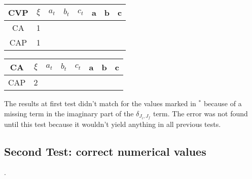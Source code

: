 \documentclass[twocolumn]{article}
\begin{document}
\begin{table}[H]
	\begin{tabular}{|c|c|c|c|c|c|c|c|}
		\hline
		CVP & $\xi $& $a_t$ & $b_t$ & $c_t$ & a & b & c \\
		\hline
		CA & 1 &   &   &   &   &   &   \\
		\hline
		CAP & 1 &   &   &   &   &   &   \\
		\hline
	\end{tabular}
\end{table}

\begin{table}[H]
	\begin{tabular}{|c|c|c|c|c|c|c|c|}
		\hline
		CA & $\xi $& $a_t$ & $b_t$ & $c_t$ & a & b & c \\
		\hline
		CAP & 2 &   &   &   &   &   &   \\
		\hline
	\end{tabular}
\end{table}


The results at first test didn't match for the values marked in $^\ast$ because of a missing term in the imaginary part of the $\delta_{J_i,J_f}$ term. The error was not found until this test because it wouldn't yield anything in all previous tests. 

\subsection{Second Test: correct numerical values}.
\end{document}
